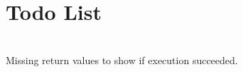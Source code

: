 \chapter{Todo List }
\hypertarget{todo}{}\label{todo}

\begin{DoxyRefList}
\item[{\parbox[t]{\linewidth}{Page \doxylink{api_references}{Available API Reference} }}]\hfill \\
\label{todo__todo000001}%
%
Missing return values to show if execution succeeded.
\end{DoxyRefList}